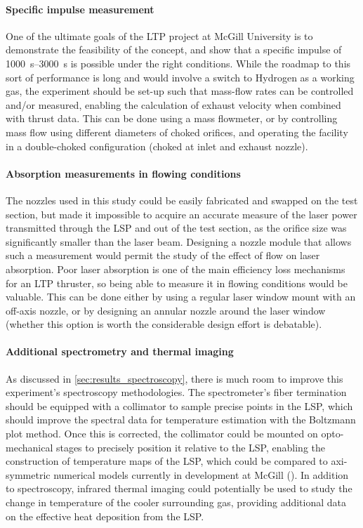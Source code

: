         \paragraph{Specific impulse measurement} One of the ultimate goals of the LTP project at McGill University is to demonstrate the feasibility of the concept, and show that a specific impulse of \qtyrange{1000}{3000}{s} is possible under the right conditions. While the roadmap to this sort of performance is long and would involve a switch to Hydrogen as a working gas, the experiment should be set-up such that mass-flow rates can be controlled and/or measured, enabling the calculation of exhaust velocity when combined with thrust data. This can be done using a mass flowmeter, or by controlling mass flow using different diameters of choked orifices, and operating the facility in a double-choked configuration (choked at inlet and exhaust nozzle).

        \paragraph{Absorption measurements in flowing conditions} The nozzles used in this study could be easily fabricated and swapped on the test section, but made it impossible to acquire an accurate measure of the laser power transmitted through the LSP and out of the test section, as the orifice size was significantly smaller than the laser beam. Designing a nozzle module that allows such a measurement would permit the study of the effect of flow on laser absorption. Poor laser absorption is one of the main efficiency loss mechanisms for an LTP thruster, so being able to measure it in flowing conditions would be valuable. This can be done either by using a regular laser window mount with an off-axis nozzle, or by designing an annular nozzle around the laser window (whether this option is worth the considerable design effort is debatable).

        \paragraph{Additional spectrometry and thermal imaging} As discussed in \autoref{sec:results_spectroscopy}, there is much room to improve this experiment's spectroscopy methodologies. The spectrometer's fiber termination should be equipped with a collimator to sample precise points in the LSP, which should improve the spectral data for temperature estimation with the Boltzmann plot method. Once this is corrected, the collimator could be mounted on opto-mechanical stages to precisely position it relative to the LSP, enabling the construction of temperature maps of the LSP, which could be compared to axi-symmetric numerical models currently in development at McGill (\textcite{baoTwoDimensionalSimulationLaser}). In addition to spectroscopy, infrared thermal imaging could potentially be used to study the change in temperature of the cooler surrounding gas, providing additional data on the effective heat deposition from the LSP.